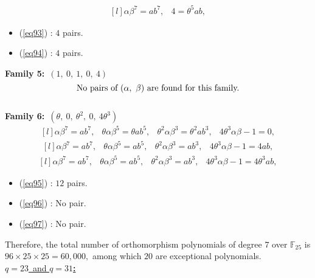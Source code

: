 \documentclass[12pt,a4wide, reqno]{amsart}
\theoremstyle{definition}
\theoremstyle{remark}
\numberwithin{equation}{section}
\begin{document}
\begin{equation}\label{eq94}
    \begin{matrix*}[l]
         \alpha \beta ^7=ab^7,  & 4=\theta^5ab,
    \end{matrix*}
\end{equation}
\begin{itemize}
    \item 
    (\ref{eq93}) : $4$ pairs.
    \item 
    (\ref{eq94}) : $4$ pairs.
    \end{itemize}
\textbf{Family 5:}~$(1,~0,~1,~0,~4)$\\
$$\textup{No pairs of}~ (\alpha,~\beta)~\textup{are found for this family.}$$\\
\textbf{Family 6:}~$(\theta,~0,~\theta^2,~0,~4\theta^3)$ 
\begin{equation}\label{eq95}
    \begin{matrix*}[l]
         \alpha \beta ^7=ab^7, & \theta \alpha\beta^5=\theta ab^5, & \theta^2\alpha\beta^3=\theta^2ab^3, & 4\theta^3\alpha\beta-1=0,
    \end{matrix*}
\end{equation}
\begin{equation}\label{eq96}
    \begin{matrix*}[l]
         \alpha \beta ^7=ab^7, & \theta\alpha\beta^5=ab^5, & \theta^2\alpha\beta^3=ab^3, & 4\theta^3\alpha\beta-1=4ab,
    \end{matrix*}
\end{equation}
\begin{equation}\label{eq97}
    \begin{matrix*}[l]
         \alpha \beta ^7=ab^7, & \theta\alpha\beta^5=ab^5, & \theta^2\alpha\beta^3=ab^3, & 4\theta^3\alpha\beta-1=4\theta^3ab,
    \end{matrix*}
\end{equation}
\begin{itemize}
    \item 
    (\ref{eq95}) : $12$ pairs.
    \item 
    (\ref{eq96}) : No pair.
    \item 
    (\ref{eq97}) : No pair.
    \end{itemize}
Therefore, the total number of orthomorphism polynomials of degree $7$ over $\mathbb{F}_{25}$ is $96\times 25\times 25=60,000,$ among which $20$ are exceptional polynomials.
 \vspace{0.5 cm}\\
\underline{\Large \textbf{$q=23$}~and \textbf{$q=31$:}}
\end{document}
